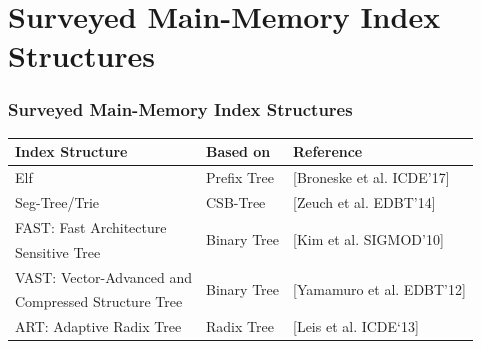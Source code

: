 \documentclass{beamer}
\begin{document}
\section{Surveyed Main-Memory Index Structures}

\begin{frame}
\frametitle{Surveyed Main-Memory Index Structures}
\footnotesize
	\begin{tabular}{l|l|l}%
		\hline
		\textbf{Index Structure} & \textbf{Based on} & \textbf{Reference} \\
		\hline
		Elf & Prefix Tree & [Broneske et al. ICDE’17] \\[.2cm]
	    Seg-Tree/Trie & CSB-Tree & [Zeuch et al. EDBT’14] \\[.2cm]
	    FAST: Fast Architecture & \multirow{2}{*}{Binary Tree} &  \multirow{2}{*}{[Kim et al. SIGMOD’10]} \\
	    Sensitive Tree  &&\\[.2cm] 
	    VAST: Vector-Advanced and  & \multirow{2}{*}{Binary Tree} &  \multirow{2}{*}{[Yamamuro et al. EDBT’12]} \\
	    Compressed Structure Tree  &&\\[.2cm] 
	    ART: Adaptive Radix Tree  & Radix Tree & [Leis et al.  ICDE`13] \\[.1cm]
	\end{tabular}
	

\end{frame}
\end{document}
